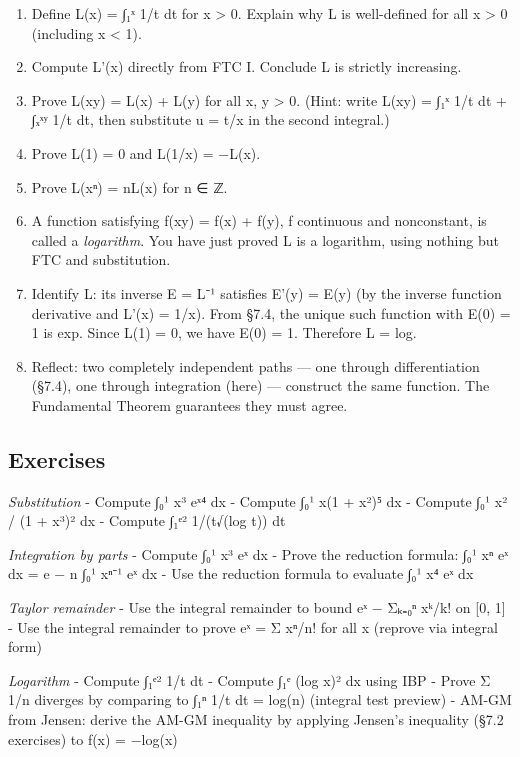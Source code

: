 \documentclass[
  10pt,
  letterpaper,
]{scrbook}
\begin{document}
\begin{enumerate}
\def\labelenumi{(\alph{enumi})}
\item
  Define L(x) = ∫₁ˣ 1/t dt for x \textgreater{} 0. Explain why L is
  well-defined for all x \textgreater{} 0 (including x \textless{} 1).
\item
  Compute L'(x) directly from FTC I. Conclude L is strictly increasing.
\item
  Prove L(xy) = L(x) + L(y) for all x, y \textgreater{} 0. (Hint: write
  L(xy) = ∫₁ˣ 1/t dt + ∫ₓˣʸ 1/t dt, then substitute u = t/x in the
  second integral.)
\item
  Prove L(1) = 0 and L(1/x) = −L(x).
\item
  Prove L(xⁿ) = nL(x) for n ∈ ℤ.
\item
  A function satisfying f(xy) = f(x) + f(y), f continuous and
  nonconstant, is called a \emph{logarithm}. You have just proved L is a
  logarithm, using nothing but FTC and substitution.
\item
  Identify L: its inverse E = L⁻¹ satisfies E'(y) = E(y) (by the inverse
  function derivative and L'(x) = 1/x). From §7.4, the unique such
  function with E(0) = 1 is exp. Since L(1) = 0, we have E(0) = 1.
  Therefore L = log.
\item
  Reflect: two completely independent paths --- one through
  differentiation (§7.4), one through integration (here) --- construct
  the same function. The Fundamental Theorem guarantees they must agree.
\end{enumerate}

\subsection{Exercises}\label{exercises-39}

\emph{Substitution} - Compute ∫₀¹ x³ eˣ⁴ dx - Compute ∫₀¹ x(1 + x²)⁵ dx
- Compute ∫₀¹ x² / (1 + x³)² dx - Compute ∫₁ᵉ² 1/(t√(log t)) dt

\emph{Integration by parts} - Compute ∫₀¹ x³ eˣ dx - Prove the reduction
formula: ∫₀¹ xⁿ eˣ dx = e − n ∫₀¹ xⁿ⁻¹ eˣ dx - Use the reduction formula
to evaluate ∫₀¹ x⁴ eˣ dx

\emph{Taylor remainder} - Use the integral remainder to bound
\textbar eˣ − Σₖ₌₀ⁿ xᵏ/k!\textbar{} on {[}0, 1{]} - Use the integral
remainder to prove eˣ = Σ xⁿ/n! for all x (reprove via integral form)

\emph{Logarithm} - Compute ∫₁ᵉ² 1/t dt - Compute ∫₁ᵉ (log x)² dx using
IBP - Prove Σ 1/n diverges by comparing to ∫₁ⁿ 1/t dt = log(n) (integral
test preview) - AM-GM from Jensen: derive the AM-GM inequality by
applying Jensen's inequality (§7.2 exercises) to f(x) = −log(x)
\end{document}
